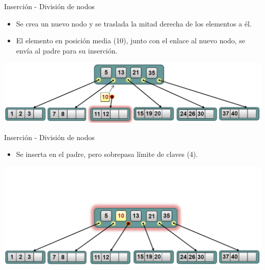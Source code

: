 \documentclass[handout]{beamer} %
\begin{document}
\begin{frame}{Inserción - División de nodos}
    \begin{itemize}
        \item Se crea un nuevo nodo y se traslada la mitad derecha de los elementos a él.
        \item El elemento en posición media (10), junto con el enlace al nuevo nodo, se envía al padre para su inserción.
    \end{itemize}
    \vspace{-.2ex}
    
    \begin{center}
        \includegraphics[width=\textwidth]{./image/cap3/b-tree-insert7}
    \end{center}
\end{frame}

\begin{frame}{Inserción - División de nodos}
    \begin{itemize}
        \item Se inserta en el padre, pero sobrepasa límite de claves (4).
    \end{itemize}
    \begin{center}
        \includegraphics[width=\textwidth]{./image/cap3/b-tree-insert8}
    \end{center}
\end{frame}
\end{document}

